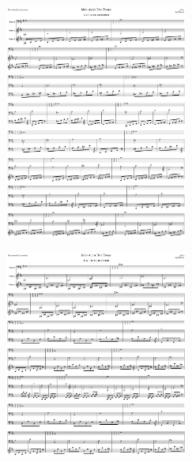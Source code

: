 \begin{figure}[H]                                             
{                                                             
  \setlength{\tabcolsep}{3.0pt}                               
  \setlength\cmidrulewidth{\heavyrulewidth} %
    \begin{subfigure}{0.5\textwidth}                            
  \includegraphics[width=6cm]{music/title_no_35_page_1001.png}%
    \end{subfigure}                                             
  \begin{subfigure}{0.5\textwidth}                            
  \includegraphics[width=6cm]{music/title_no_36_page_1001.png}%
    \end{subfigure}                                             
}                                                             
\end{figure}                                                  


